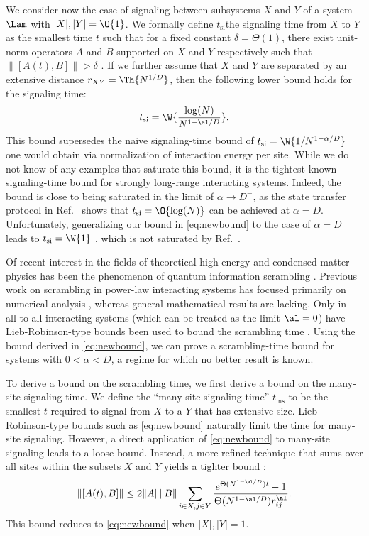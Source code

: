 We consider now the case of signaling between subsystems $X$ and $Y$ of a system $\Lam$ with $|X|,|Y|=\O{1}$.
We formally define $t_\text{si}$\dash the signaling time from $X$ to $Y$\dash as the smallest time $t$ such that for a fixed constant $\delta=\Theta(1)$, there exist unit-norm operators $A$ and $B$ supported on $X$ and $Y$ respectively such that $\|[A(t),B]\| > \delta$ \cite{Lashkari13}.
If we further assume that $X$ and $Y$ are separated by an extensive distance $r_{XY}=\Th{N^{1/D}}$, then the following lower bound holds for the signaling time:
\begin{equation}
	\label{eq:tsi}
	t_\text{si}=  \W{\frac{\log(N)}{N^{1-\al/D}}}.
\end{equation}
This bound supersedes the naive signaling-time bound of $t_\text{si}= \W{ 1/N^{1-\alpha/D}}$ one would obtain via normalization of interaction energy per site.
While we do not know of any examples that saturate this bound, it is the tightest-known signaling-time bound for strongly long-range interacting systems.
Indeed, the bound is close to being saturated in the limit of $\alpha\rightarrow D^-$, as the state transfer protocol in Ref.~\cite{Eldredge17} shows that $t_\text{si}=\O{\log(N)}$ can be achieved at $\alpha=D$. Unfortunately, generalizing our bound in \cref{eq:newbound} to the case of $\alpha=D$ leads to $t_\text{si}=\W{1}$ \cite{SM}, which is not saturated by Ref.~\cite{Eldredge17}.

Of recent interest in the fields of theoretical high-energy and condensed matter physics has been the phenomenon of quantum information scrambling \cite{Lashkari13,Swingle16,SS08,Hayden07,Xu18,Shenker14,Hosur16,Nahum18,Keyserlingk18,Roberts18,Gu17}.
Previous work on scrambling in power-law interacting systems has focused primarily on numerical analysis \cite{Pappalardi18,Zhou18}, whereas general mathematical results are lacking.
Only in all-to-all interacting systems (which can be treated as the limit $\al=0$) have Lieb-Robinson-type bounds been used to bound the scrambling time \cite{Lashkari13}.
Using the bound derived in \cref{eq:newbound}, we can prove a scrambling-time bound for systems with $0<\alpha<D$, a regime for which no better result is known.

To derive a bound on the scrambling time, we first derive a bound on the many-site signaling time. We define the ``many-site signaling time'' $t_\text{ms}$ to be the smallest $t$ required to signal from $X$ to a $Y$ that has extensive size.
Lieb-Robinson-type bounds such as \cref{eq:newbound} naturally limit the time for many-site signaling. However, a direct application of \cref{eq:newbound} to many-site signaling leads to a loose bound. Instead, a more refined technique that sums over all sites within the subsets $X$ and $Y$ yields a tighter bound \cite{Gong17}:
\begin{equation}
\label{refinedbound}
    \|[A(t),B]\|\le  2\|A\|\|B\|\sum_{i\in X, j\in Y}\frac{e^{\Theta(N^{1-\al/D})t}-1}{\Theta(N^{1-\al/D})r_{ij}^\al}.
\end{equation}
This bound reduces to \cref{eq:newbound} when $|X|,|Y|=1$.

